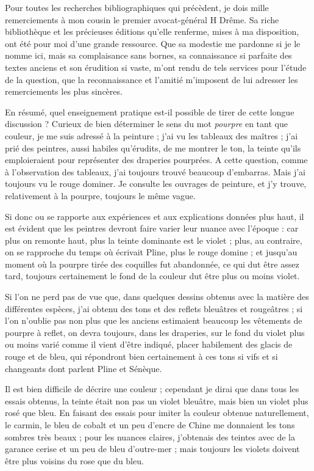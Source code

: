 \documentclass[a4paper, 11pt, oneside, polutonikogreek, french]{article}
\begin{document}
Pour toutes les recherches bibliographiques qui précèdent, je dois mille remerciements à mon cousin le premier avocat-général H Drême. Sa riche bibliothèque et les précieuses éditions qu'elle renferme, mises à ma disposition, ont été pour moi d'une grande ressource. Que sa modestie me pardonne si je le nomme ici, mais sa complaisance sans bornes, sa connaissance si parfaite des textes anciens et son érudition si vaste, m'ont rendu de tels services pour l'étude de la question, que la reconnaissance et l'amitié m'imposent de lui adresser les remerciements les plus sincères.

En résumé, quel enseignement pratique est-il possible de tirer de cette longue discussion ? Curieux de bien déterminer le sens du mot \emph{pourpre} en tant que couleur, je me suis adressé à la peinture ; j'ai vu les tableaux des maîtres ; j'ai prié des peintres, aussi habiles qu'érudits, de me montrer le ton, la teinte qu'ils emploieraient pour représenter des draperies pourprées. A cette question, comme à l'observation des tableaux, j'ai toujours trouvé beaucoup d'embarras. Mais j'ai toujours vu le rouge dominer. Je consulte les ouvrages de peinture, et j'y trouve, relativement à la pourpre, toujours le même vague.

Si donc ou se rapporte aux expériences et aux explications données plus haut, il est évident que les peintres devront faire varier leur nuance avec l'époque : car plus on remonte haut, plus la teinte dominante est le violet ; plus, au contraire, on se rapproche du temps où écrivait Pline, plus le rouge domine ; et jusqu'au moment où la pourpre tirée des coquilles fut abandonnée, ce qui dut être assez tard, toujours certainement le fond de la couleur dut être plus ou moins violet.

Si l'on ne perd pas de vue que, dans quelques dessins obtenus avec la matière des différentes espèces, j'ai obtenu des tons et des reflets bleuâtres et rougeâtres ; si l'on n'oublie pas non plus que les anciens estimaient beaucoup les vêtements de pourpre à reflet, on devra toujours, dans les draperies, sur le fond du violet plus ou moins varié comme il vient d'être indiqué, placer habilement des glacis de rouge et de bleu, qui répondront bien certainement à ces tons si vifs et si changeants dont parlent Pline et Sénèque.

Il est bien difficile de décrire une couleur ; cependant je dirai que dans tous les essais obtenus, la teinte était non pas un violet bleuâtre, mais bien un violet plus rosé que bleu. En faisant des essais pour imiter la couleur obtenue naturellement, le carmin, le bleu de cobalt et un peu d'encre de Chine me donnaient les tons sombres très beaux ; pour les nuances claires, j'obtenais des teintes avec de la garance cerise et un peu de bleu d'outre-mer ; mais toujours les violets doivent être plus voisins du rose que du bleu.
\end{document}

